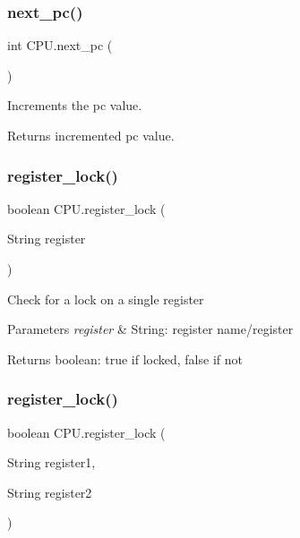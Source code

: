 \subsubsection{\texorpdfstring{next\+\_\+pc()}{next\_pc()}}
{\footnotesize\ttfamily int C\+P\+U.\+next\+\_\+pc (\begin{DoxyParamCaption}{ }\end{DoxyParamCaption})\hspace{0.3cm}{\ttfamily [private]}}

Increments the pc value. \begin{DoxyReturn}{Returns}
incremented pc value. 
\end{DoxyReturn}
\mbox{\label{class_c_p_u_ae2b2850e5cec1defd6072a965d9435b3}} 
\subsubsection{\texorpdfstring{register\+\_\+lock()}{register\_lock()}\hspace{0.1cm}{\footnotesize\ttfamily [1/2]}}
{\footnotesize\ttfamily boolean C\+P\+U.\+register\+\_\+lock (\begin{DoxyParamCaption}\item[{String}]{register }\end{DoxyParamCaption})\hspace{0.3cm}{\ttfamily [private]}}

Check for a lock on a single register


\begin{DoxyParams}{Parameters}
{\em register} & String\+: register name/register \\
\hline
\end{DoxyParams}
\begin{DoxyReturn}{Returns}
boolean\+: true if locked, false if not 
\end{DoxyReturn}
\mbox{\label{class_c_p_u_a80a32deceb58fe8d9d146c5486ce7f0b}} 
\subsubsection{\texorpdfstring{register\+\_\+lock()}{register\_lock()}\hspace{0.1cm}{\footnotesize\ttfamily [2/2]}}
{\footnotesize\ttfamily boolean C\+P\+U.\+register\+\_\+lock (\begin{DoxyParamCaption}\item[{String}]{register1,  }\item[{String}]{register2 }\end{DoxyParamCaption})\hspace{0.3cm}{\ttfamily [private]}}

